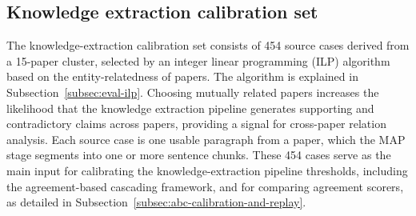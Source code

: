 \subsection{Knowledge extraction calibration set}\label{subsec:knowledge-extraction-calibration-set}

The knowledge-extraction calibration set consists of 454 source cases derived from a 15-paper cluster, selected by an integer linear programming (ILP) algorithm based on the entity-relatedness of papers. The algorithm is explained in Subsection~\ref{subsec:eval-ilp}. Choosing mutually related papers increases the likelihood that the knowledge extraction pipeline generates supporting and contradictory claims across papers, providing a signal for cross-paper relation analysis. Each source case is one usable paragraph from a paper, which the MAP stage segments into one or more sentence chunks. These 454 cases serve as the main input for calibrating the knowledge-extraction pipeline thresholds, including the agreement-based cascading framework, and for comparing agreement scorers, as detailed in Subsection~\ref{subsec:abc-calibration-and-replay}.
